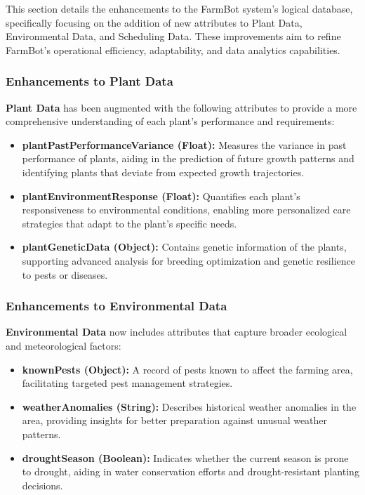 This section details the enhancements to the FarmBot system's logical database, specifically focusing on the addition of new attributes to Plant Data, Environmental Data, and Scheduling Data. These improvements aim to refine FarmBot's operational efficiency, adaptability, and data analytics capabilities.

\subsubsection{Enhancements to Plant Data}

\textbf{Plant Data} has been augmented with the following attributes to provide a more comprehensive understanding of each plant's performance and requirements:

\begin{itemize}
    \item \textbf{plantPastPerformanceVariance (Float):} Measures the variance in past performance of plants, aiding in the prediction of future growth patterns and identifying plants that deviate from expected growth trajectories.
    \item \textbf{plantEnvironmentResponse (Float):} Quantifies each plant's responsiveness to environmental conditions, enabling more personalized care strategies that adapt to the plant's specific needs.
    \item \textbf{plantGeneticData (Object):} Contains genetic information of the plants, supporting advanced analysis for breeding optimization and genetic resilience to pests or diseases.
\end{itemize}

\subsubsection{Enhancements to Environmental Data}

\textbf{Environmental Data} now includes attributes that capture broader ecological and meteorological factors:

\begin{itemize}
    \item \textbf{knownPests (Object):} A record of pests known to affect the farming area, facilitating targeted pest management strategies.
    \item \textbf{weatherAnomalies (String):} Describes historical weather anomalies in the area, providing insights for better preparation against unusual weather patterns.
    \item \textbf{droughtSeason (Boolean):} Indicates whether the current season is prone to drought, aiding in water conservation efforts and drought-resistant planting decisions.
\end{itemize}

